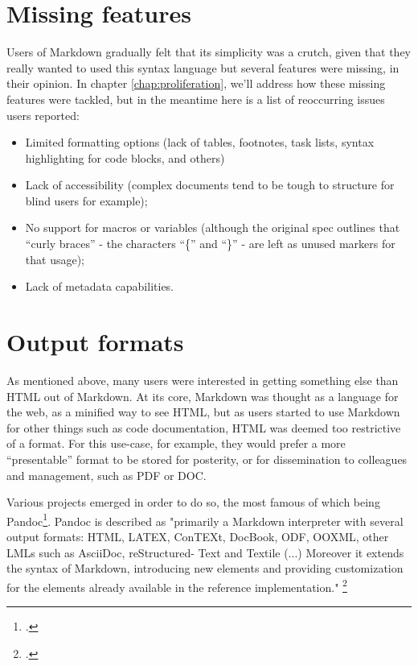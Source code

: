 \section{Missing features}
\label{sec: missing-features}

Users of Markdown gradually felt that its simplicity was a crutch, given that they really wanted to used this syntax language but several
features were missing, in their opinion. In chapter \ref{chap:proliferation}, we'll address how these missing features were tackled, but
in the meantime here is a list of reoccurring issues users reported:

\begin{itemize}
    \item Limited formatting options (lack of tables, footnotes, task lists, syntax highlighting for code blocks, and others)
    \item Lack of accessibility (complex documents tend to be tough to structure for blind users for example);
    \item No support for macros or variables (although the original spec outlines that ``curly braces'' - the characters ``\{'' and ``\}''
    - are left as unused markers for that usage);
    \item Lack of metadata capabilities.
\end{itemize}

\section{Output formats}
\label{sec:output-formats}

As mentioned above, many users were interested in getting something else than HTML out of Markdown. At its core, Markdown was thought as
a language for the web, as a minified way to see HTML, but as users started to use Markdown for other things such as code documentation,
HTML was deemed too restrictive of a format. For this use-case, for example, they would prefer a more ``presentable'' format to be stored
for posterity, or for dissemination to colleagues and management, such as PDF or DOC.\newline

Various projects emerged in order to do so, the most famous of which being Pandoc\footcite{pandoc}. Pandoc is described as "primarily a Markdown
interpreter with several output formats: HTML, LATEX, ConTEXt, DocBook, ODF, OOXML, other LMLs such as AsciiDoc, reStructured-
Text and Textile (...) Moreover it extends the syntax of Markdown, introducing new elements and providing customization for the elements already
available in the reference implementation." \footcite{dominici2014overview} \newline

